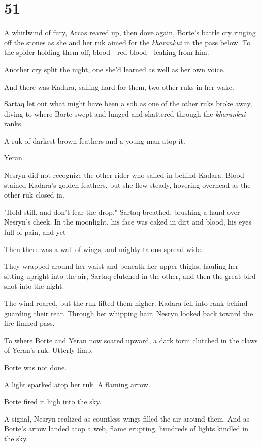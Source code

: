 
\chapter{51}

A whirlwind of fury, Arcas reared up, then dove again, Borte's battle cry ringing off the stones as she and her ruk aimed for the
\emph{kharankui} in the pass below. To the spider holding them off, blood---red blood---leaking from him.

Another cry split the night, one she'd learned as well as her own voice.

And there was Kadara, sailing hard for them, two other ruks in her wake.

Sartaq let out what might have been a sob as one of the other ruks broke away, diving to where Borte swept and lunged and shattered through the
\emph{kharankui} ranks.

A ruk of darkest brown feathers  and a young man atop it.

Yeran.

Nesryn did not recognize the other rider who sailed in behind Kadara. Blood stained Kadara's golden feathers, but she flew steady, hovering overhead as the other ruk closed in.

"Hold still, and don't fear the drop," Sartaq breathed, brushing a hand over Nesryn's cheek. In the moonlight, his face was caked in dirt and blood, his eyes full of pain, and yet---

Then there was a wall of wings, and mighty talons spread wide.

They wrapped around her waist and beneath her upper thighs, hauling her sitting upright into the air, Sartaq clutched in the other, and then the great bird shot into the night.

The wind roared, but the ruk lifted them higher. Kadara fell into rank behind ---guarding their rear. Through her whipping hair, Nesryn looked back toward the fire-limned pass.

To where Borte and Yeran now soared upward, a dark form clutched in the claws of Yeran's ruk. Utterly limp.

Borte was not done.

A light sparked atop her ruk. A flaming arrow.

Borte fired it high into the sky.

A signal, Nesryn realized as countless wings filled the air around them. And as Borte's arrow landed atop a web, flame erupting, hundreds of lights kindled in the sky.

